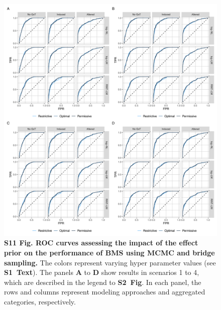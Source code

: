 \documentclass[11pt]{article}
\newcommand{\stext}{\textbf{S1~Text}\xspace}
\newcommand{\sfigroccmcmc}{\textbf{S2~Fig}\xspace}
\begin{document}
\begin{figure}[!ht]
\begin{center}
  \includegraphics[width=1\textwidth]{png/sim_rocc_effect_mcmc_bs.png}
\end{center}  
\caption{
  {\bf
    S11 Fig.
    ROC curves assessing the impact of the effect prior on the performance of BMS using MCMC and bridge sampling.}
The colors represent varying hyper parameter values (see
\stext). The panels \textbf{A} to \textbf{D} show results in scenarios 1 to 4, which are described in the legend to
\sfigroccmcmc. In each panel, the rows and columns represent modeling approaches and aggregated categories, respectively.
}
\label{s-fig:sim-rocc-effect-mcmc}
\end{figure}
\end{document}
